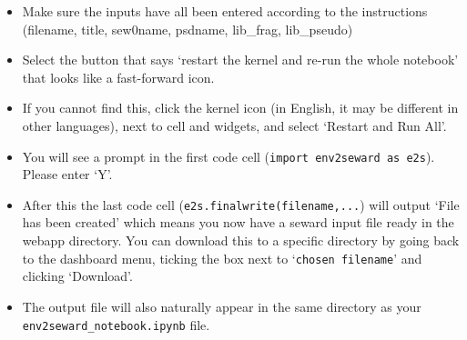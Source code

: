 \documentclass[10pt]{article}
\begin{document}
\begin{itemize}
	\item Make sure the inputs have all been entered according to the instructions (filename, title, sew0name, psdname, lib\_frag, lib\_pseudo)
	\item Select the button that says `restart the kernel and re-run the whole notebook' that looks like a fast-forward icon.
	\item If you cannot find this, click the kernel icon (in English, it may be different in other languages), next to cell and widgets, and select `Restart and Run All'.
	\item You will see a prompt in the first code cell (\texttt{import env2seward as e2s}). Please enter `Y'.
	\item After this the last code cell (\texttt{e2s.finalwrite(filename,...}) will output `File has been created' which means you now have a seward input file ready in the webapp directory. You can download this to a specific directory by going back to the dashboard menu, ticking the box next to `\texttt{chosen filename}' and clicking `Download'.
	\item The output file will also naturally appear in the same directory as your \texttt{env2seward\_notebook.ipynb} file.
\end{itemize}



\end{document}
